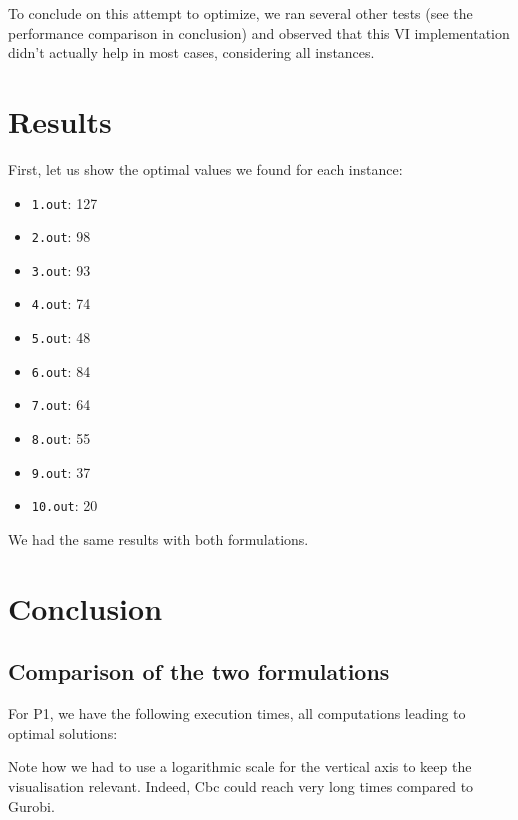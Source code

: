 \documentclass[a4paper,10pt]{article}
\begin{document}
To conclude on this attempt to optimize, we ran several other tests (see the performance comparison in conclusion) and observed that this VI implementation didn't actually help in most cases, considering all instances.




\section{Results}

First, let us show the optimal values we found for each instance:
\begin{itemize}
	\item \texttt{1.out}: 127
	\item \texttt{2.out}: 98
	\item \texttt{3.out}: 93
	\item \texttt{4.out}: 74
	\item \texttt{5.out}: 48
	\item \texttt{6.out}: 84
	\item \texttt{7.out}: 64
	\item \texttt{8.out}: 55
	\item \texttt{9.out}: 37
	\item \texttt{10.out}: 20
\end{itemize}

We had the same results with both formulations.

\section{Conclusion}
	\subsection{Comparison of the two formulations}
	
	For P1, we have the following execution times, all computations leading to optimal solutions:


Note how we had to use a logarithmic scale for the vertical axis to keep the visualisation relevant. Indeed, Cbc could reach very long times compared to Gurobi.
\end{document}
